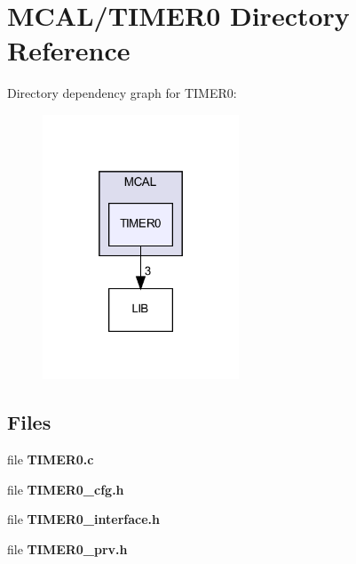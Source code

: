 \section{M\+C\+A\+L/\+T\+I\+M\+E\+R0 Directory Reference}
\label{dir_b88f1dc9287a5bc2a8bff2eace05ec04}
Directory dependency graph for T\+I\+M\+E\+R0\+:\nopagebreak
\begin{figure}[H]
\begin{center}
\leavevmode
\includegraphics[width=166pt]{dir_b88f1dc9287a5bc2a8bff2eace05ec04_dep}
\end{center}
\end{figure}
\subsection*{Files}
\begin{DoxyCompactItemize}
\item 
file \textbf{ T\+I\+M\+E\+R0.\+c}
\item 
file \textbf{ T\+I\+M\+E\+R0\+\_\+cfg.\+h}
\item 
file \textbf{ T\+I\+M\+E\+R0\+\_\+interface.\+h}
\item 
file \textbf{ T\+I\+M\+E\+R0\+\_\+prv.\+h}
\end{DoxyCompactItemize}
